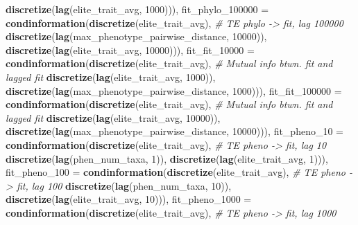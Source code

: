 \documentclass[]{book}
\newenvironment{Shaded}{\begin{snugshade}}{\end{snugshade}}
\newcommand{\CommentTok}[1]{\textcolor[rgb]{0.56,0.35,0.01}{\textit{#1}}}
\newcommand{\DataTypeTok}[1]{\textcolor[rgb]{0.13,0.29,0.53}{#1}}
\newcommand{\DecValTok}[1]{\textcolor[rgb]{0.00,0.00,0.81}{#1}}
\newcommand{\KeywordTok}[1]{\textcolor[rgb]{0.13,0.29,0.53}{\textbf{#1}}}
\newcommand{\NormalTok}[1]{#1}
\begin{document}
\begin{Shaded}
\begin{Highlighting}[]
{                                     \KeywordTok{discretize}\NormalTok{(}\KeywordTok{lag}\NormalTok{(elite_trait_avg, }\DecValTok{1000}\NormalTok{))),}
  \DataTypeTok{fit_phylo_100000 =} \KeywordTok{condinformation}\NormalTok{(}\KeywordTok{discretize}\NormalTok{(elite_trait_avg), }\CommentTok{# TE phylo -> fit, lag 100000}
                                     \KeywordTok{discretize}\NormalTok{(}\KeywordTok{lag}\NormalTok{(max_phenotype_pairwise_distance, }\DecValTok{10000}\NormalTok{)), }
                                     \KeywordTok{discretize}\NormalTok{(}\KeywordTok{lag}\NormalTok{(elite_trait_avg, }\DecValTok{10000}\NormalTok{))),  }
  \DataTypeTok{fit_fit_10000 =}    \KeywordTok{condinformation}\NormalTok{(}\KeywordTok{discretize}\NormalTok{(elite_trait_avg), }\CommentTok{# Mutual info btwn. fit and lagged fit}
                                     \KeywordTok{discretize}\NormalTok{(}\KeywordTok{lag}\NormalTok{(elite_trait_avg, }\DecValTok{1000}\NormalTok{)), }
                                     \KeywordTok{discretize}\NormalTok{(}\KeywordTok{lag}\NormalTok{(max_phenotype_pairwise_distance, }\DecValTok{1000}\NormalTok{))),}
  \DataTypeTok{fit_fit_100000 =}   \KeywordTok{condinformation}\NormalTok{(}\KeywordTok{discretize}\NormalTok{(elite_trait_avg), }\CommentTok{# Mutual info btwn. fit and lagged fit}
                                     \KeywordTok{discretize}\NormalTok{(}\KeywordTok{lag}\NormalTok{(elite_trait_avg, }\DecValTok{10000}\NormalTok{)), }
                                     \KeywordTok{discretize}\NormalTok{(}\KeywordTok{lag}\NormalTok{(max_phenotype_pairwise_distance, }\DecValTok{10000}\NormalTok{))),  }
  \DataTypeTok{fit_pheno_10 =}     \KeywordTok{condinformation}\NormalTok{(}\KeywordTok{discretize}\NormalTok{(elite_trait_avg), }\CommentTok{# TE pheno -> fit, lag 10}
                                     \KeywordTok{discretize}\NormalTok{(}\KeywordTok{lag}\NormalTok{(phen_num_taxa, }\DecValTok{1}\NormalTok{)), }
                                     \KeywordTok{discretize}\NormalTok{(}\KeywordTok{lag}\NormalTok{(elite_trait_avg, }\DecValTok{1}\NormalTok{))),}
  \DataTypeTok{fit_pheno_100 =}    \KeywordTok{condinformation}\NormalTok{(}\KeywordTok{discretize}\NormalTok{(elite_trait_avg),  }\CommentTok{# TE pheno -> fit, lag 100 }
                                     \KeywordTok{discretize}\NormalTok{(}\KeywordTok{lag}\NormalTok{(phen_num_taxa, }\DecValTok{10}\NormalTok{)), }
                                     \KeywordTok{discretize}\NormalTok{(}\KeywordTok{lag}\NormalTok{(elite_trait_avg, }\DecValTok{10}\NormalTok{))),}
  \DataTypeTok{fit_pheno_1000 =}   \KeywordTok{condinformation}\NormalTok{(}\KeywordTok{discretize}\NormalTok{(elite_trait_avg),  }\CommentTok{# TE pheno -> fit, lag 1000}
}
\end{Highlighting}
\end{Shaded}
\end{document}

